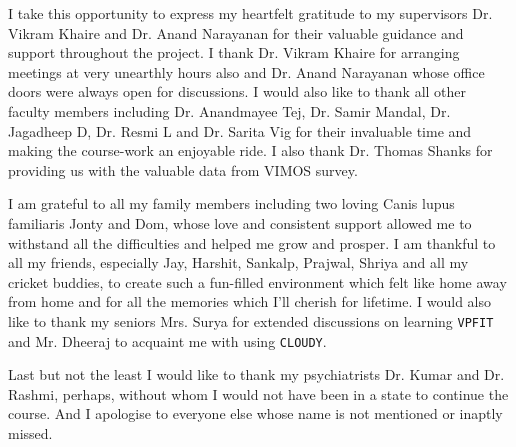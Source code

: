 \begin{ThesisAcknowledgments}

I take this opportunity to express my heartfelt gratitude to my supervisors Dr. Vikram Khaire and Dr. Anand Narayanan for their valuable guidance and support throughout the project. I thank Dr. Vikram Khaire for arranging meetings at very unearthly hours also and Dr. Anand Narayanan whose office doors were always open for discussions. I would also like to thank all other faculty members including Dr. Anandmayee Tej, Dr. Samir Mandal, Dr. Jagadheep D, Dr. Resmi L and Dr. Sarita Vig for their invaluable time and making the course-work an enjoyable ride. I also thank Dr. Thomas Shanks for providing us with the valuable data from VIMOS survey.

I am grateful to all my family members including two loving Canis lupus familiaris Jonty and Dom, whose love and consistent support allowed me to withstand all the difficulties and helped me grow and prosper. I am thankful to all my friends, especially Jay, Harshit, Sankalp, Prajwal, Shriya and all my cricket buddies, to create such a fun-filled environment which felt like home away from home and for all the memories which I'll cherish for lifetime. I would also like to thank my seniors Mrs. Surya for extended discussions on learning {\tt VPFIT} and Mr. Dheeraj to acquaint me with using {\tt CLOUDY}. 

Last but not the least I would like to thank my psychiatrists Dr. Kumar and Dr. Rashmi, perhaps, without whom I would not have been in a state to continue the course. And I apologise to everyone else whose name is not mentioned or inaptly missed.

\vspace{25mm}

\hfill \Author

\end{ThesisAcknowledgments}

